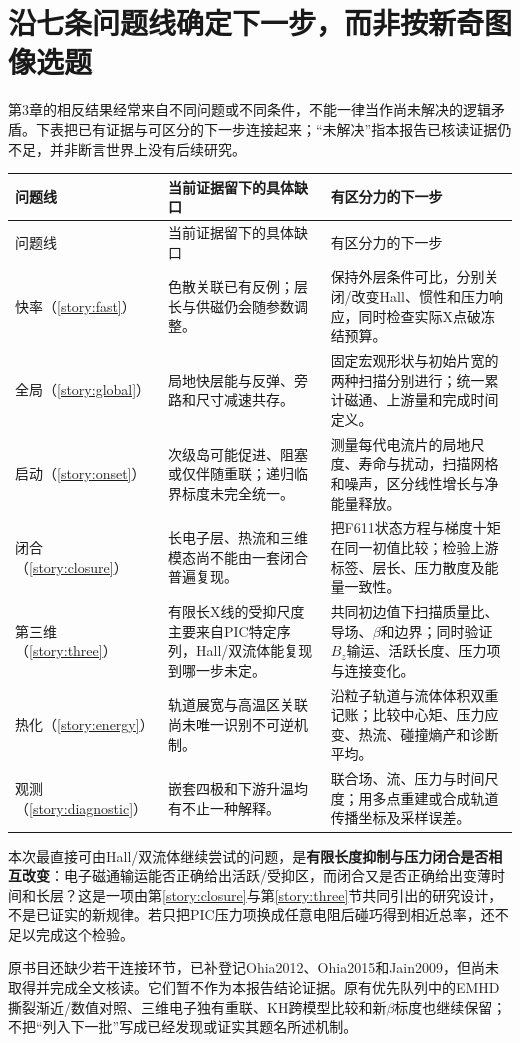 \section{沿七条问题线确定下一步，而非按新奇图像选题}
第3章的相反结果经常来自不同问题或不同条件，不能一律当作尚未解决的逻辑矛盾。下表把已有证据与可区分的下一步连接起来；“未解决”指本报告已核读证据仍不足，并非断言世界上没有后续研究。
\begin{longtable}{P{25mm}P{55mm}P{66mm}}
\toprule 问题线 & 当前证据留下的具体缺口 & 有区分力的下一步\\\midrule\endfirsthead
\toprule 问题线 & 当前证据留下的具体缺口 & 有区分力的下一步\\\midrule\endhead
快率（\ref{story:fast}） &
色散关联已有反例；层长与供磁仍会随参数调整。 &
保持外层条件可比，分别关闭/改变Hall、惯性和压力响应，同时检查实际X点破冻结预算。\\
全局（\ref{story:global}） &
局地快层能与反弹、旁路和尺寸减速共存。 &
固定宏观形状与初始片宽的两种扫描分别进行；统一累计磁通、上游量和完成时间定义。\\
启动（\ref{story:onset}） &
次级岛可能促进、阻塞或仅伴随重联；递归临界标度未完全统一。 &
测量每代电流片的局地尺度、寿命与扰动，扫描网格和噪声，区分线性增长与净能量释放。\\
闭合（\ref{story:closure}） &
长电子层、热流和三维模态尚不能由一套闭合普遍复现。 &
把F611状态方程与梯度十矩在同一初值比较；检验上游标签、层长、压力散度及能量一致性。\\
第三维（\ref{story:three}） &
有限长X线的受抑尺度主要来自PIC特定序列，Hall/双流体能复现到哪一步未定。 &
共同初边值下扫描质量比、导场、$\beta$和边界；同时验证$B_z$输运、活跃长度、压力项与连接变化。\\
热化（\ref{story:energy}） &
轨道展宽与高温区关联尚未唯一识别不可逆机制。 &
沿粒子轨道与流体体积双重记账；比较中心矩、压力应变、热流、碰撞熵产和诊断平均。\\
观测（\ref{story:diagnostic}） &
嵌套四极和下游升温均有不止一种解释。 &
联合场、流、压力与时间尺度；用多点重建或合成轨道传播坐标及采样误差。\\
\bottomrule
\end{longtable}

本次最直接可由Hall/双流体继续尝试的问题，是\textbf{有限长度抑制与压力闭合是否相互改变}：电子磁通输运能否正确给出活跃/受抑区，而闭合又是否正确给出变薄时间和长层？这是一项由第\ref{story:closure}与第\ref{story:three}节共同引出的研究设计，不是已证实的新规律。若只把PIC压力项换成任意电阻后碰巧得到相近总率，还不足以完成这个检验。\citep{F611,F659,F792}

原书目还缺少若干连接环节，已补登记Ohia2012、Ohia2015和Jain2009，但尚未取得并完成全文核读。它们暂不作为本报告结论证据。原有优先队列中的EMHD撕裂渐近/数值对照、三维电子独有重联、KH跨模型比较和新$\beta$标度也继续保留；不把“列入下一批”写成已经发现或证实其题名所述机制。
